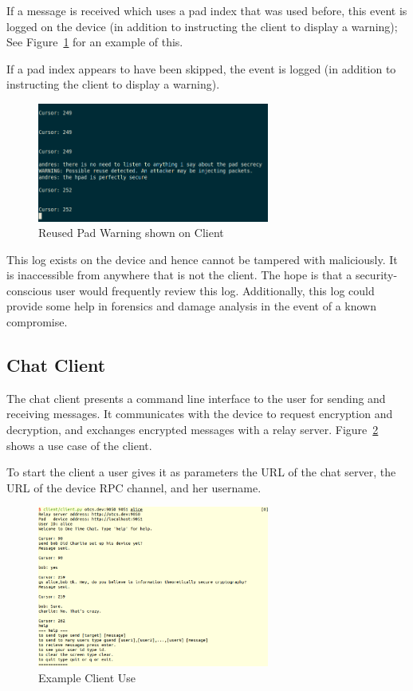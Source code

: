 \documentclass[twocolumn]{article}
\begin{document}
If a message is received which uses a pad index that was used before,
this event is logged on the device (in addition to instructing the client
to display a warning); See Figure~\ref{fig:reuse} for an example of this.

If a pad index appears to have been skipped, the event is logged (in addition to instructing the client to display a warning).

\begin{figure}[htp]
\centering
\includegraphics[width=3in]{reuse}
\caption{Reused Pad Warning shown on Client}
\label{fig:reuse}
\end{figure}

This log exists on the device and hence cannot be tampered with maliciously. It is inaccessible from anywhere that is not the client.
The hope is that a security-conscious user would frequently review this log. Additionally, this log could provide some help in forensics
and damage analysis in the event of a known compromise.

\subsection{Chat Client}
\label{sec:client}

The chat client presents a command line interface to the user for sending and receiving messages. It communicates with the device to request encryption and decryption, and exchanges encrypted messages with a relay server. Figure~\ref{fig:clientexample} shows a use case of the client.

To start the client a user gives it as parameters the URL of the chat server, the URL of the device RPC channel, and her username.

\begin{figure}[htp]
\centering
\includegraphics[width=3in]{sample}
\caption{Example Client Use}
\label{fig:clientexample}
\end{figure}
\end{document}
